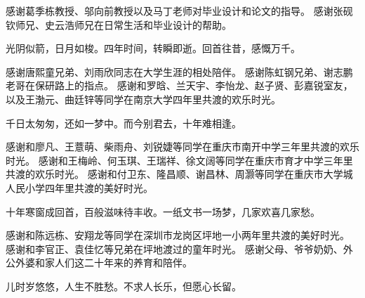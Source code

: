 \documentclass[
  ]{njuthesis}
\begin{document}

\printbibliography


\begin{acknowledgement}
    
    感谢葛季栋教授、邬向前教授以及马丁老师对毕业设计和论文的指导。
    感谢张砚钦师兄、史云浩师兄在日常生活和毕业设计的帮助。
    
    光阴似箭，日月如梭。四年时间，转瞬即逝。回首往昔，感慨万千。
    
    感谢唐熙童兄弟、刘雨欣同志在大学生涯的相处陪伴。
    感谢陈虹钢兄弟、谢志鹏老哥在保研路上的指点。
    感谢和罗晗、兰天宇、李怡龙、赵子贤、彭嘉锐室友，以及王渤元、曲廷锌等同学在南京大学四年里共渡的欢乐时光。
    
    千日太匆匆，还如一梦中。而今别君去，十年难相逢。
    
    感谢和廖凡、王薏萌、柴雨舟、刘锐婕等同学在重庆市南开中学三年里共渡的欢乐时光。
    感谢和王梅岭、何玉琪、王瑞祥、徐文阔等同学在重庆市育才中学三年里共渡的欢乐时光。
    感谢和付卫东、隆昌顺、谢昌林、周灏等同学在重庆市大学城人民小学四年里共渡的美好时光。
    
    十年寒窗成回首，百般滋味待丰收。一纸文书一场梦，几家欢喜几家愁。
    
    感谢和陈远栋、安翔龙等同学在深圳市龙岗区坪地一小两年里共渡的美好时光。
    感谢和李官正、袁佳忆等兄弟在坪地渡过的童年时光。
    感谢父母、爷爷奶奶、外公外婆和家人们这二十年来的养育和陪伴。
    
    儿时岁悠悠，人生不胜愁。不求人长乐，但愿心长留。

\end{acknowledgement}






\end{document}
